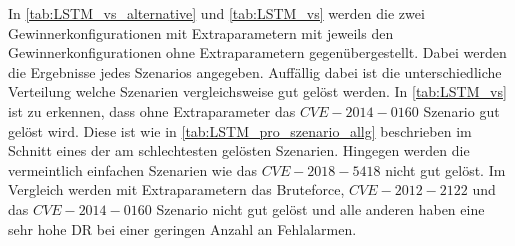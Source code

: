     In  \autoref{tab:LSTM_vs_alternative} und \autoref{tab:LSTM_vs} werden die zwei Gewinnerkonfigurationen mit Extraparametern mit jeweils den Gewinnerkonfigurationen ohne Extraparametern gegenübergestellt.
    Dabei werden die Ergebnisse jedes Szenarios angegeben. 
    Auffällig dabei ist die unterschiedliche Verteilung welche Szenarien vergleichsweise gut gelöst werden.
    In \autoref{tab:LSTM_vs} ist zu erkennen, dass ohne Extraparameter das $CVE-2014-0160$ Szenario gut gelöst wird.
    Diese ist wie in \autoref{tab:LSTM_pro_szenario_allg} beschrieben im Schnitt eines der am schlechtesten gelösten Szenarien.
    Hingegen werden die vermeintlich einfachen Szenarien wie das $CVE-2018-5418$ nicht gut gelöst.
    Im Vergleich werden mit Extraparametern das Bruteforce, $CVE-2012-2122$ und das $CVE-2014-0160$ Szenario nicht gut gelöst und alle anderen haben eine sehr hohe \ac{DR} bei einer geringen Anzahl an Fehlalarmen.


